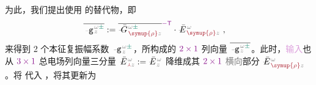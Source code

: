 为此，我们\cite{xieAnalytic3DVector}提出使用  的替代物，即
\begin{align} \label{eq:amp_vec-transverse_input}
	\overline{\xint{\begin{smallmatrix} ~ \\ {}^{}_{\mathcolor{gray}{-}} \\ ~ \end{smallmatrix}}{09}{\mathtt{g}}^{\;\!\mathcolor{gray}{\omega} \textcolor{PineGreen}{\pm}}_{\;\! \mathcolor{gray}{z}}} &:= \overline{\xint{\mathcolor{gray}{-}}{20}{\bar{G}}^{\;\!\mathcolor{gray}{\omega} \textcolor{PineGreen}{\pm}}_{\;\! \textcolor{Maroon}{\symup{\rho}} \mathcolor{gray}{z}}}^{\textcolor{Plum}{-\mathsf{T}}} \cdot \xint{\mathcolor{gray}{-}}{30}{\bar{E}}^{\;\!\mathcolor{gray}{\omega}}_{\;\! \textcolor{Maroon}{\symup{\rho}} \mathcolor{gray}{z}} ~,
\end{align}
来得到 2 个\textcolor{PineGreen}{本征复振幅}系数 $\xint{\begin{smallmatrix} ~ \\ {}^{}_{\mathcolor{gray}{-}} \\ ~ \end{smallmatrix}}{09}{\mathtt{g}}^{\;\!\mathcolor{gray}{\omega} \textcolor{PineGreen}{\pm}}_{\;\! \mathcolor{gray}{z}}$，所构成的 $\textcolor{Plum}{2 \times 1}$ 列向量 $\overline{\xint{\begin{smallmatrix} ~ \\ {}^{}_{\mathcolor{gray}{-}} \\ ~ \end{smallmatrix}}{09}{\mathtt{g}}^{\;\!\mathcolor{gray}{\omega} \textcolor{PineGreen}{\pm}}_{\;\! \mathcolor{gray}{z}}}$。此时，\textcolor{Plum}{输入}也从 $\textcolor{Plum}{3 \times 1}$ \textcolor{PineGreen}{总电场列向量}三分量 $\xint{\mathcolor{gray}{-}}{25}{\bar{E}}^{\;\!\mathcolor{gray}{\omega}}_{\;\! \textcolor{Maroon}{\Yup} \mathcolor{gray}{z}} := \xint{\mathcolor{gray}{-}}{25}{\bar{E}}^{\;\!\mathcolor{gray}{\omega}}_{\;\! \mathcolor{gray}{z}}$ 降维成其 $\textcolor{Plum}{2 \times 1}$ \textcolor{gray}{横向}部分 $\xint{\mathcolor{gray}{-}}{25}{\bar{E}}^{\;\!\mathcolor{gray}{\omega}}_{\;\! \textcolor{Maroon}{\symup{\rho}} \mathcolor{gray}{z}}$。将  代入 ，将其更新为
